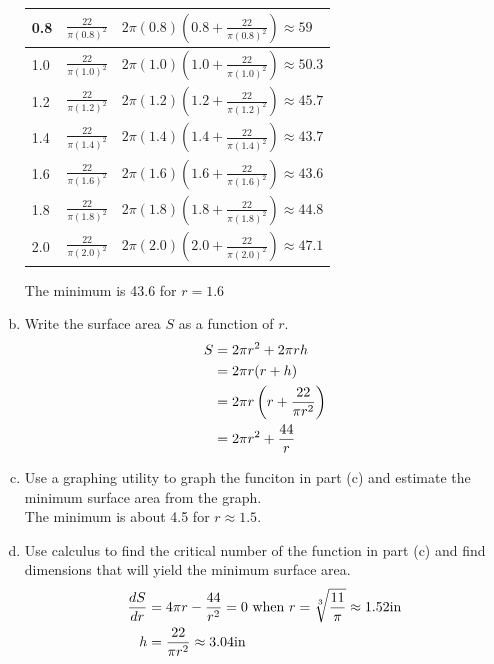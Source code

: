 \documentclass[11pt]{article}
\newcommand*{\set}{\setcounter{equation}{0}}
\begin{document}
\begin{enumerate}[(a)]
\begin{flushleft}
\begin{table}[h]
\begin{tabular}{|l|l|l|}
                0.8 & $\frac{22}{\pi(0.8)^2}$ & $2\pi(0.8)\left(0.8+\frac{22}{\pi(0.8)^2}\right)\approx 59$\\\hline
                1.0 & $\frac{22}{\pi(1.0)^2}$ & $2\pi(1.0)\left(1.0+\frac{22}{\pi(1.0)^2}\right)\approx 50.3$\\\hline
                1.2 & $\frac{22}{\pi(1.2)^2}$ & $2\pi(1.2)\left(1.2+\frac{22}{\pi(1.2)^2}\right)\approx 45.7$\\\hline
                1.4 & $\frac{22}{\pi(1.4)^2}$ & $2\pi(1.4)\left(1.4+\frac{22}{\pi(1.4)^2}\right)\approx 43.7$\\\hline
                1.6 & $\frac{22}{\pi(1.6)^2}$ & $2\pi(1.6)\left(1.6+\frac{22}{\pi(1.6)^2}\right)\approx 43.6$\\\hline
                1.8 & $\frac{22}{\pi(1.8)^2}$ & $2\pi(1.8)\left(1.8+\frac{22}{\pi(1.8)^2}\right)\approx 44.8$\\\hline
                2.0 & $\frac{22}{\pi(2.0)^2}$ & $2\pi(2.0)\left(2.0+\frac{22}{\pi(2.0)^2}\right)\approx 47.1$\\\hline
            \end{tabular}
        \end{table}
    \end{flushleft}
        The minimum is 43.6 for $r=1.6$ \newpage
    \item Write the surface area $S$ as a function of $r$.
        \begin{align}
            \set
            S&=2\pi r^2+2\pi rh\\
            &=2\pi r(r+h)\\
            &=2\pi r\left(r+\frac{22}{\pi r^2}\right)\\
            &=2\pi r^2+\frac{44}{r}
        \end{align}
        \item Use a graphing utility to graph the funciton in part (c) and estimate the minimum surface area from the graph.\\
            The minimum is about 4.5 for $r\approx 1.5$.
        \item Use calculus to find the critical number of the function in part (c) and find dimensions that will yield the minimum surface area.
            \begin{align}
                \set
                \frac{dS}{dr}&=4\pi r-\frac{44}{r^2}=0\,\,\text{when}\,\, r=\sqrt[3]{\frac{11}{\pi}}\approx 1.52\text{in}\\
                h&=\frac{22}{\pi r^2}\approx 3.04\text{in}
            \end{align}
\end{enumerate}
\end{document}

